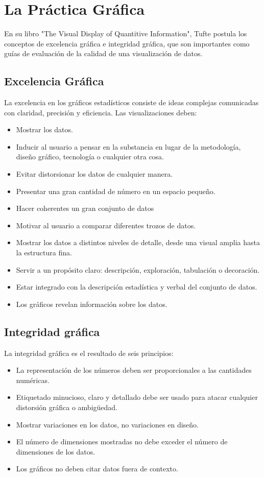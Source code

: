 \section{La Práctica Gráfica}

En su libro "The Visual Display of Quantitive Information", Tufte \cite{Tuf83} postula los conceptos de excelencia gráfica e integridad gráfica, que son importantes como guías de evaluación de la calidad de una visualización de datos.

\subsection{Excelencia Gráfica}

La excelencia en los gráficos estadísticos consiste de ideas complejas comunicadas con claridad, precisión y eficiencia. Las visualizaciones deben:

\begin{itemize}
  \item Mostrar los datos.
  \item Inducir al usuario a pensar en la substancia en lugar de la metodología, diseño gráfico, tecnología o cualquier otra cosa.
  \item Evitar distorsionar los datos de cualquier manera.
  \item Presentar una gran cantidad de número en un espacio pequeño.
  \item Hacer coherentes un gran conjunto de datos
  \item Motivar al usuario a comparar diferentes trozos de datos.
  \item Mostrar los datos a distintos niveles de detalle, desde una visual amplia hasta la estructura fina.
  \item Servir a un propósito claro: descripción, exploración, tabulación o decoración.
  \item Estar integrado con la descripción estadística y verbal del conjunto de datos.
  \item Los gráficos revelan información sobre los datos.
\end{itemize}

\subsection{Integridad gráfica}

La integridad gráfica es el resultado de seis principios:

\begin{itemize}
  \item La representación de los números deben ser proporcionales a las cantidades numéricas.
  \item Etiquetado minucioso, claro y detallado debe ser usado para atacar cualquier distorsión gráfica o ambigüedad.
  \item Mostrar variaciones en los datos, no variaciones en diseño.
  \item El número de dimensiones mostradas no debe exceder el número de dimensiones de los datos.
  \item Los gráficos no deben citar datos fuera de contexto.
\end{itemize}
